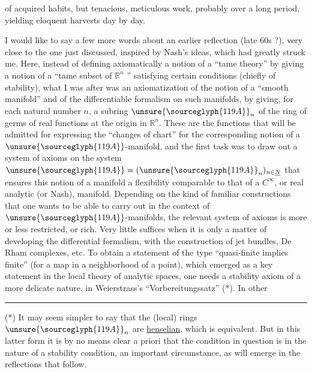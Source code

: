 
of acquired habits, but tenacious, meticulous work,
probably over a long period, yielding eloquent harvests
day by day.

I would like to say a few more words about an earlier
reflection (late 60s ?), very close to the one just
discussed, inspired by Nash's ideas, which had
greatly struck me. Here, instead of defining axiomatically a notion
of a ``tame theory'' by giving a notion of a ``tame subset
of $\mathbb{R}^n$ '' satisfying certain conditions (chiefly of stability),
what I was after was an axiomatization of the notion of a ``smooth manifold'' and of the
differentiable formalism on such manifolds,
by giving, for each natural number $n$, a subring
$\unsure{\sourceglyph{119A}}_n$ of the ring of germs of real functions at the origin in $\mathbb{R}^n$.
These are the functions that will be admitted for expressing the ``changes
of chart'' for the corresponding notion of a $\unsure{\sourceglyph{119A}}$-manifold, and the
first task was to draw out a system of axioms on the
system $\unsure{\sourceglyph{119A}} = (\unsure{\sourceglyph{119A}}_n)_{n\in\underline{N}}$ that ensures this notion of a manifold a
flexibility comparable to that of a $C^\infty$, or real analytic
(or Nash), manifold. Depending on the kind of familiar constructions that
one wants to be able to carry out in the context of $\unsure{\sourceglyph{119A}}$-manifolds, the
relevant system of axioms is more or less restricted, or rich.
Very little suffices when it is only a matter of developing the
differential formalism, with the construction of jet bundles, De Rham
complexes, etc. To obtain a statement of the type ``quasi-finite implies
finite'' (for a map in a neighborhood of a point), which
emerged as a key statement in the local theory of analytic
spaces, one needs a stability axiom of a more delicate nature,
in Weierstrass's ``Vorbereitungssatz'' (*). In other

\rule{4cm}{0.4pt}

(*) It may seem simpler to say that the (local) rings
$\unsure{\sourceglyph{119A}}_n$ are \uline{henselian}, which is equivalent. But in this latter
form it is by no means clear a priori that the condition in
question is in the nature of a stability condition, an
important circumstance, as will emerge in the reflections that follow.

